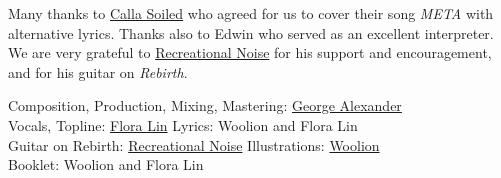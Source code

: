 
\vspace*{\fill}


Many thanks to \href{https://callasoiled.net/}{Calla Soiled} who agreed for us to cover their song \textit{META} with alternative lyrics.
Thanks also to Edwin who served as an excellent interpreter.
We are very grateful to \href{https://recreationalnoise.bandcamp.com/}{Recreational Noise} for his support and encouragement, and for his guitar on \textit{Rebirth}.


Composition, Production, Mixing, Mastering: \href{https://linktr.ee/randleman}{George Alexander}\\
Vocals, Topline: \href{https://floralinmusic.com/}{Flora Lin}
Lyrics: Woolion and Flora Lin\\
Guitar on Rebirth: \href{https://recreationalnoise.bandcamp.com/}{Recreational Noise}
Illustrations: \href{https://woolion.art/}{Woolion}\\
Booklet: Woolion and Flora Lin
